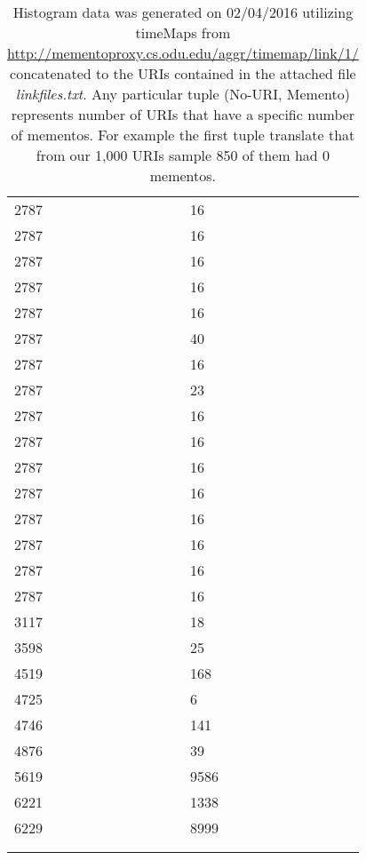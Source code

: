 \begin{table}[!htbp]
\begin{minipage}{0.25\textwidth}
\begin{tabular}{|l | l|}
			2787 & 16\\
			2787 & 16\\
			2787 & 16\\
			2787 & 16\\
			2787 & 16\\
			2787 & 40\\
			2787 & 16\\
			2787 & 23\\
			2787 & 16\\
			2787 & 16\\
			2787 & 16\\
			2787 & 16\\
			2787 & 16\\
			2787 & 16\\
			2787 & 16\\
			2787 & 16\\
			3117 & 18\\
			3598 & 25\\
			4519 & 168\\
			4725 & 6\\
			4746 & 141\\
			4876 & 39\\
			5619 & 9586\\
			6221 & 1338\\
			6229 & 8999\\
			&\\
			&\\
			\hline
		\end{tabular}
	\end{minipage}	
	\caption*{\scriptsize Histogram data was generated on 02/04/2016 utilizing timeMaps from
	\url{http://mementoproxy.cs.odu.edu/aggr/timemap/link/1/} concatenated to the URIs contained in the
	 attached file \textit{linkfiles.txt}. Any particular tuple (No-URI, Memento) represents number of
	 URIs that have a specific number of mementos. For example the first tuple translate that from our 1,000 URIs sample 850 of them had 0 mementos. }
\end{table}
\newpage
